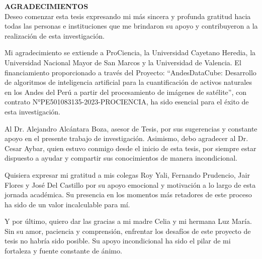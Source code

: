 \begin{agradecimientos}
\vspace{50 mm}
\normalsize\textbf{AGRADECIMIENTOS} \\

Deseo comenzar esta tesis expresando mi más sincera y profunda gratitud hacia todas las personas e instituciones que me brindaron su apoyo y contribuyeron a la realización de esta investigación.

Mi agradecimiento se extiende a ProCiencia, la Universidad Cayetano Heredia, la Universidad Nacional Mayor de San Marcos y la Universidad de Valencia. El financiamiento proporcionado a través del Proyecto: “AndesDataCube: Desarrollo de algoritmos de inteligencia artificial para la cuantificación de activos naturales en los Andes del Perú a partir del procesamiento de imágenes de satélite”, con contrato N°PE501083135-2023-PROCIENCIA, ha sido esencial para el éxito de esta investigación.

Al Dr. Alejandro Alcántara Boza, asesor de Tesis, por sus sugerencias y constante apoyo en el presente trabajo de investigación. Asimismo, debo agradecer al Dr. Cesar Aybar, quien estuvo conmigo desde el inicio de esta tesis, por siempre estar dispuesto a ayudar y compartir sus conocimientos de manera incondicional.

Quisiera expresar mi gratitud a mis colegas Roy Yali, Fernando Prudencio, Jair Flores y José Del Castillo por su apoyo emocional y motivación a lo largo de esta jornada académica. Su presencia en los momentos más retadores de este proceso ha sido de un valor incalculable para mí.

Y por último, quiero dar las gracias a mi madre Celia y mi hermana Luz María. Sin su amor, paciencia y comprensión, enfrentar los desafíos de este proyecto de tesis no habría sido posible. Su apoyo incondicional ha sido el pilar de mi fortaleza y fuente constante de ánimo.

\end{agradecimientos}